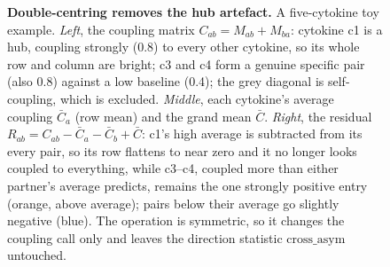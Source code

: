 \documentclass[11pt,a4paper]{article}
\newcommand{\rev}[1]{#1}  %
\begin{document}
\begin{figure}[H]
\caption{\rev{\textbf{Double-centring removes the hub artefact.} A five-cytokine toy example.
\emph{Left}, the coupling matrix $C_{ab}=M_{ab}+M_{ba}$: cytokine c1 is a hub, coupling
strongly (0.8) to every other cytokine, so its whole row and column are bright; c3 and c4
form a genuine specific pair (also 0.8) against a low baseline (0.4); the grey diagonal is
self-coupling, which is excluded. \emph{Middle}, each cytokine's average coupling
$\bar C_a$ (row mean) and the grand mean $\bar C$. \emph{Right}, the residual
$R_{ab}=C_{ab}-\bar C_a-\bar C_b+\bar C$: c1's high average is subtracted from its every
pair, so its row flattens to near zero and it no longer looks coupled to everything, while
c3--c4, coupled more than either partner's average predicts, remains the one strongly
positive entry (orange, above average); pairs below their average go slightly negative
(blue). The operation is symmetric, so it changes the coupling call only and leaves the
direction statistic $\mathrm{cross\_asym}$ untouched.}}
\label{fig:doublecenter}
\end{figure}
\end{document}
